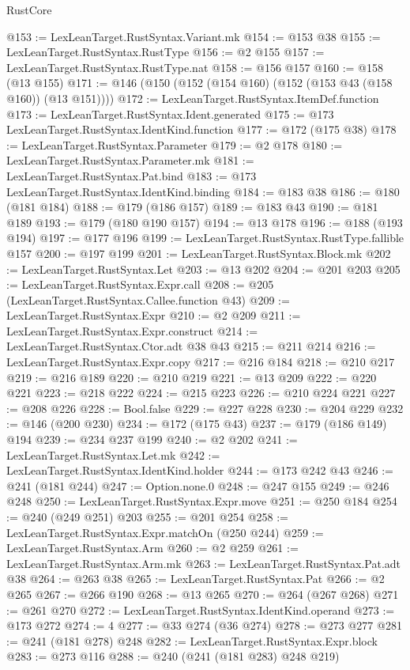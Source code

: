 \begin{lexlean}{RustCore}
\begin{coremodule}
@153 := LexLeanTarget.RustSyntax.Variant.mk
@154 := @153 @38
@155 := LexLeanTarget.RustSyntax.RustType
@156 := @2 @155
@157 := LexLeanTarget.RustSyntax.RustType.nat
@158 := @156 @157
@160 := @158 (@13 @155)
@171 := @146 (@150 (@152 (@154 @160) (@152 (@153 @43 (@158 @160)) (@13 @151))))
@172 := LexLeanTarget.RustSyntax.ItemDef.function
@173 := LexLeanTarget.RustSyntax.Ident.generated
@175 := @173 LexLeanTarget.RustSyntax.IdentKind.function
@177 := @172 (@175 @38)
@178 := LexLeanTarget.RustSyntax.Parameter
@179 := @2 @178
@180 := LexLeanTarget.RustSyntax.Parameter.mk
@181 := LexLeanTarget.RustSyntax.Pat.bind
@183 := @173 LexLeanTarget.RustSyntax.IdentKind.binding
@184 := @183 @38
@186 := @180 (@181 @184)
@188 := @179 (@186 @157)
@189 := @183 @43
@190 := @181 @189
@193 := @179 (@180 @190 @157)
@194 := @13 @178
@196 := @188 (@193 @194)
@197 := @177 @196
@199 := LexLeanTarget.RustSyntax.RustType.fallible @157
@200 := @197 @199
@201 := LexLeanTarget.RustSyntax.Block.mk
@202 := LexLeanTarget.RustSyntax.Let
@203 := @13 @202
@204 := @201 @203
@205 := LexLeanTarget.RustSyntax.Expr.call
@208 := @205 (LexLeanTarget.RustSyntax.Callee.function @43)
@209 := LexLeanTarget.RustSyntax.Expr
@210 := @2 @209
@211 := LexLeanTarget.RustSyntax.Expr.construct
@214 := LexLeanTarget.RustSyntax.Ctor.adt @38 @43
@215 := @211 @214
@216 := LexLeanTarget.RustSyntax.Expr.copy
@217 := @216 @184
@218 := @210 @217
@219 := @216 @189
@220 := @210 @219
@221 := @13 @209
@222 := @220 @221
@223 := @218 @222
@224 := @215 @223
@226 := @210 @224 @221
@227 := @208 @226
@228 := Bool.false
@229 := @227 @228
@230 := @204 @229
@232 := @146 (@200 @230)
@234 := @172 (@175 @43)
@237 := @179 (@186 @149) @194
@239 := @234 @237 @199
@240 := @2 @202
@241 := LexLeanTarget.RustSyntax.Let.mk
@242 := LexLeanTarget.RustSyntax.IdentKind.holder
@244 := @173 @242 @43
@246 := @241 (@181 @244)
@247 := Option.none.{0}
@248 := @247 @155
@249 := @246 @248
@250 := LexLeanTarget.RustSyntax.Expr.move
@251 := @250 @184
@254 := @240 (@249 @251) @203
@255 := @201 @254
@258 := LexLeanTarget.RustSyntax.Expr.matchOn (@250 @244)
@259 := LexLeanTarget.RustSyntax.Arm
@260 := @2 @259
@261 := LexLeanTarget.RustSyntax.Arm.mk
@263 := LexLeanTarget.RustSyntax.Pat.adt @38
@264 := @263 @38
@265 := LexLeanTarget.RustSyntax.Pat
@266 := @2 @265
@267 := @266 @190
@268 := @13 @265
@270 := @264 (@267 @268)
@271 := @261 @270
@272 := LexLeanTarget.RustSyntax.IdentKind.operand
@273 := @173 @272
@274 := 4
@277 := @33 @274 (@36 @274)
@278 := @273 @277
@281 := @241 (@181 @278) @248
@282 := LexLeanTarget.RustSyntax.Expr.block
@283 := @273 @116
@288 := @240 (@241 (@181 @283) @248 @219)

\end{coremodule}
\end{lexlean}
